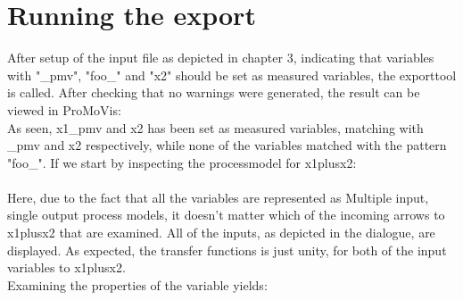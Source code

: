\section{Running the export}
After setup of the input file as depicted in chapter 3, indicating that variables with "\_pmv", "foo\_" and "x2" should be set as measured variables, the exporttool is called. After checking that no warnings were generated, the result can be viewed in ProMoVis:
\setlength\fboxsep{0pt}
\setlength\fboxrule{0.5pt}
\\\newline
As seen,  x1\_pmv and x2 has been set as measured variables, matching with \_pmv and x2 respectively, while none of the variables matched with the pattern "foo\_". If we start by inspecting the processmodel for x1plusx2:\\\newline
\setlength\fboxsep{0pt}
\setlength\fboxrule{0.5pt}
\\\newline
Here, due to the fact that all the variables are represented as Multiple input, single output process models, it doesn't matter which of the incoming arrows to x1plusx2 that are examined. All of the inputs, as depicted in the dialogue, are displayed. As expected, the transfer functions is just unity, for both of the input variables to x1plusx2. \\\newline
Examining the properties of the variable yields:

